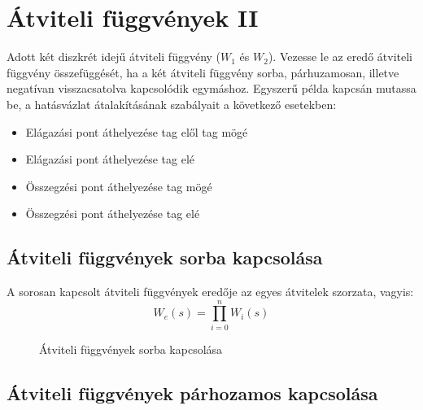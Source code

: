 \documentclass[../main.tex]{subfiles}
\begin{document}
\section{Átviteli függvények II}

\begin{fulltheorem}
  Adott két diszkrét idejű átviteli függvény ($W_1$ és $W_2$).
  Vezesse le az eredő átviteli függvény összefüggését, ha a két átviteli
  függvény sorba, párhuzamosan, illetve negatívan visszacsatolva kapcsolódik
  egymáshoz. Egyszerű példa kapcsán mutassa be, a hatásvázlat átalakításának
  szabályait a következő esetekben:
  \begin{itemize}
    \item Elágazási pont áthelyezése tag elől tag mögé
    \item Elágazási pont áthelyezése tag elé
    \item Összegzési pont áthelyezése tag mögé
    \item Összegzési pont áthelyezése tag elé
  \end{itemize}
\end{fulltheorem}

\subsection{Átviteli függvények sorba kapcsolása}

A sorosan kapcsolt átviteli függvények eredője az egyes átvitelek szorzata,
vagyis:
\[
  W_e(s) = \prod_{i=0}^n W_i(s)
\]

\begin{figure}[H]
  \centering
  \caption{Átviteli függvények sorba kapcsolása}
  \label{fig:linearW}
\end{figure}

\subsection{Átviteli függvények párhozamos kapcsolása}
\end{document}
